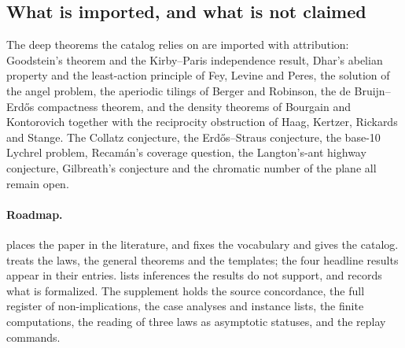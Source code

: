 \subsection{What is imported, and what is not claimed}\label{sec:intro-claims}

The deep theorems the catalog relies on are imported with attribution: Goodstein's theorem and the Kirby--Paris independence result, Dhar's abelian
property and the least-action principle of Fey, Levine and Peres, the solution of the angel
problem, the aperiodic tilings of Berger and Robinson, the de Bruijn--Erd\H{o}s compactness
theorem, and the density theorems of Bourgain and Kontorovich together with the reciprocity
obstruction of Haag, Kertzer, Rickards and Stange. The Collatz conjecture, the Erd\H{o}s--Straus
conjecture, the base-10 Lychrel problem, Recam\'an's coverage question, the Langton's-ant highway
conjecture, Gilbreath's conjecture and the chromatic number of the plane all remain open.

\paragraph{Roadmap.}  places the paper in the literature, and 
fixes the vocabulary and gives the catalog.  treats the laws, 
the general theorems and  the templates; the four headline results appear in
their entries.  lists inferences the results do not support,
and  records what is formalized. The supplement holds the source concordance, the
full register of non-implications, the case analyses and instance lists, the finite computations,
the reading of three laws as asymptotic statuses, and the replay commands.
